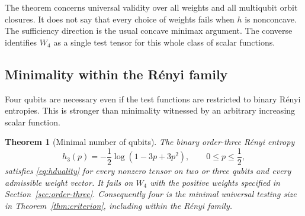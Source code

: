 \documentclass[11pt,a4paper]{article}
\newtheorem{theorem}{Theorem}
\begin{document}
The theorem concerns universal validity over all weights and all
multiqubit orbit closures. It does not say that every choice of
weights fails when \(h\) is nonconcave. The sufficiency direction
is the usual concave minimax argument. The converse identifies
\(W_4\) as a single test tensor for this whole class of scalar functions.

\subsection{Minimality within the R\'enyi family}
Four qubits are necessary even if the test functions are restricted to
binary R\'enyi entropies. This is stronger than minimality witnessed by
an arbitrary increasing scalar function.

\begin{theorem}[Minimal number of qubits]\label{thm:minimality}
The binary order-three R\'enyi entropy
\[
 h_3(p)=-\frac12\log(1-3p+3p^2),\qquad 0\le p\le\frac12,
\]
satisfies \eqref{eq:hduality} for every nonzero tensor on two or three
qubits and every admissible weight vector. It fails on \(W_4\) with
the positive weights specified in Section~\ref{sec:order-three}.
Consequently four is the minimal universal testing size in
Theorem~\ref{thm:criterion}, including within the R\'enyi family.
\end{theorem}
\end{document}
